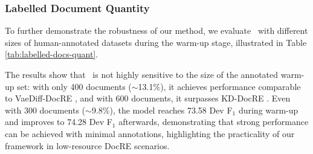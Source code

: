 \subsubsection{Labelled Document Quantity}
To further demonstrate the robustness of our method, we evaluate \model\ with different sizes of human-annotated datasets during the warm-up stage, illustrated in Table \ref{tab:labelled-docs-quant}.
\begin{table}[!h]
    \centering
\caption{Performance vs. Labelled Document quantity}
\label{tab:labelled-docs-quant}
\vspace{-3mm}
\end{table}

The results show that \model\ is not highly sensitive to the size of the annotated warm-up set: with only 400 documents ($\sim$13.1\%), it achieves performance comparable to VaeDiff-DocRE \cite{tran2025vaediff}, and with 600 documents, it surpasses KD-DocRE \cite{tan2022document}. Even with 300 documents ($\sim$9.8\%), the model reaches 73.58 Dev F$_1$ during warm-up and improves to 74.28 Dev F$_1$ afterwards, demonstrating that strong performance can be achieved with minimal annotations, highlighting the practicality of our framework in low-resource DocRE scenarios.




